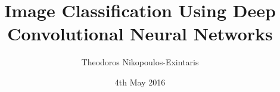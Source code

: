 
\title{Image Classification Using Deep Convolutional Neural Networks}

\author{Theodoros Nikopoulos-Exintaris}




\date{4th May 2016} %




\maketitle



